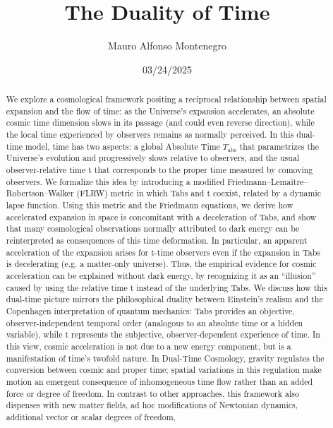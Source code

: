 \documentclass[12pt]{article}
\title{The Duality of Time}
\author[1,*]{Mauro Alfonso Montenegro}
\affil[1]{Liberty University}
\date{03/24/2025}
\newcommand{\Tabs}{T_{\mathrm{abs}}}
\begin{document}
\maketitle
\vspace{0.8em}

\begin{abstract}

We explore a cosmological framework positing a reciprocal relationship between
spatial expansion and the flow of time: as the Universe’s expansion accelerates, an
absolute cosmic time dimension slows in its passage (and could even reverse direction),
while the local time experienced by observers remains as normally perceived. In this
dual-time model, time has two aspects: a global Absolute Time $\Tabs$ that parametrizes
the Universe’s evolution and progressively slows relative to observers, and the usual
observer-relative time t that corresponds to the proper time measured by comoving
observers. We formalize this idea by introducing a modified Friedmann–Lemaître–
Robertson–Walker (FLRW) metric in which Tabs and t coexist, related by a dynamic
lapse function. Using this metric and the Friedmann equations, we derive how accelerated
expansion in space is concomitant with a deceleration of Tabs, and show that many
cosmological observations normally attributed to dark energy can be reinterpreted
as consequences of this time deformation. In particular, an apparent acceleration of
the expansion arises for t-time observers even if the expansion in Tabs is decelerating
(e.g. a matter-only universe). Thus, the empirical evidence for cosmic acceleration
can be explained without dark energy, by recognizing it as an “illusion” caused by
using the relative time t instead of the underlying Tabs. We discuss how this dual-time
picture mirrors the philosophical duality between Einstein’s realism and the Copenhagen
interpretation of quantum mechanics: Tabs provides an objective, observer-independent
temporal order (analogous to an absolute time or a hidden variable), while t represents
the subjective, observer-dependent experience of time. In this view, cosmic acceleration
is not due to a new energy component, but is a manifestation of time’s twofold nature.
In Dual-Time Cosmology, gravity regulates the conversion between cosmic and proper
time; spatial variations in this regulation make motion an emergent consequence of
inhomogeneous time flow rather than an added force or degree of freedom. In contrast
to other approaches, this framework also dispenses with new matter fields, ad hoc
modifications of Newtonian dynamics, additional vector or scalar degrees of freedom,

\end{abstract}
\end{document}
